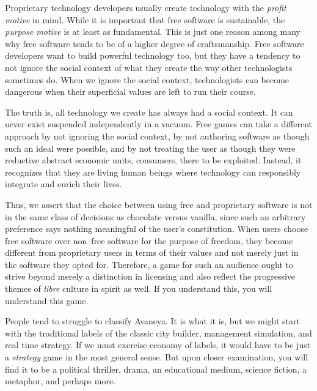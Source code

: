 Proprietary technology developers usually create technology with the {\it profit motive} in mind. While it is important that free software is sustainable, the {\it purpose motive} is at least as fundamental. This is just one reason among many why free software tends to be of a higher degree of craftsmanship. Free software developers want to build powerful technology too, but they have a tendency to not ignore the social context of what they create the way other technologists sometimes do. When we ignore the social context, technologists can become dangerous when their superficial values are left to run their course.\footnotecite[black2012]\footnotecite[brew2012]

The truth is, all technology we create has always had a social context. It can never exist suspended independently in a vacuum. Free games can take a different approach by not ignoring the social context, by not authoring software as though such an ideal were possible, and by not treating the user as though they were reductive abstract economic units, consumers, there to be exploited. Instead, it recognizes that they are living human beings where technology can responsibly integrate and enrich their lives. 

Thus, we assert that the choice between using free and proprietary software is not in the same class of decisions as chocolate versus vanilla, since such an arbitrary preference says nothing meaningful of the user's constitution. When users choose free software over non--free software for the purpose of freedom, they become different from proprietary users in terms of their values and not merely just in the software they opted for. Therefore, a game for such an audience ought to strive beyond merely a distinction in licensing and also reflect the progressive themes of {\it libre} culture in spirit as well. If you understand this, you will understand this game.

People tend to struggle to classify Avaneya. It is what it is, but we might start with the traditional labels of the classic city builder, management simulation, and real time strategy. If we must exercise economy of labels, it would have to be just a {\it strategy} game in the most general sense. But upon closer examination, you will find it to be a political thriller, drama, an educational medium, science fiction, a metaphor, and perhaps more.

